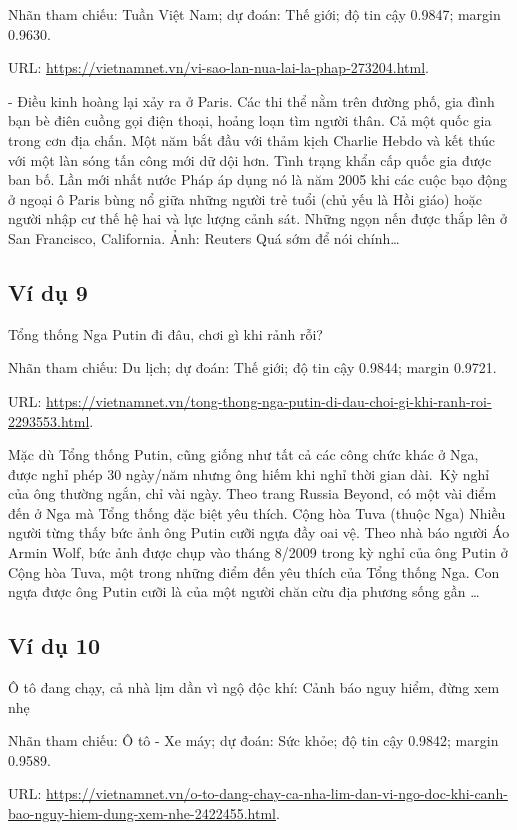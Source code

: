 \noindent Nhãn tham chiếu: Tuần Việt Nam; dự đoán: Thế giới; độ tin cậy 0.9847; margin 0.9630.

\noindent URL: \url{https://vietnamnet.vn/vi-sao-lan-nua-lai-la-phap-273204.html}.

- Điều kinh hoàng lại xảy ra ở Paris. Các thi thể nằm trên đường phố, gia đình bạn bè điên cuồng gọi điện thoại, hoảng loạn tìm người thân. Cả một quốc gia trong cơn địa chấn. Một năm bắt đầu với thảm kịch Charlie Hebdo và kết thúc với một làn sóng tấn công mới dữ dội hơn. Tình trạng khẩn cấp quốc gia được ban bố. Lần mới nhất nước Pháp áp dụng nó là năm 2005 khi các cuộc bạo động ở ngoại ô Paris bùng nổ giữa những người trẻ tuổi (chủ yếu là Hồi giáo) hoặc người nhập cư thế hệ hai và lực lượng cảnh sát. Những ngọn nến được thắp lên ở San Francisco, California. Ảnh: Reuters Quá sớm để nói chính\ldots

\subsection{Ví dụ 9}
Tổng thống Nga Putin đi đâu, chơi gì khi rảnh rỗi?

\noindent Nhãn tham chiếu: Du lịch; dự đoán: Thế giới; độ tin cậy 0.9844; margin 0.9721.

\noindent URL: \url{https://vietnamnet.vn/tong-thong-nga-putin-di-dau-choi-gi-khi-ranh-roi-2293553.html}.

Mặc dù Tổng thống Putin, cũng giống như tất cả các công chức khác ở Nga, được nghỉ phép 30 ngày/năm nhưng ông hiếm khi nghỉ thời gian dài. Kỳ nghỉ của ông thường ngắn, chỉ vài ngày. Theo trang Russia Beyond, có một vài điểm đến ở Nga mà Tổng thống đặc biệt yêu thích. Cộng hòa Tuva (thuộc Nga) Nhiều người từng thấy bức ảnh ông Putin cưỡi ngựa đầy oai vệ. Theo nhà báo người Áo Armin Wolf, bức ảnh được chụp vào tháng 8/2009 trong kỳ nghỉ của ông Putin ở Cộng hòa Tuva, một trong những điểm đến yêu thích của Tổng thống Nga. Con ngựa được ông Putin cưỡi là của một người chăn cừu địa phương sống gần \ldots

\subsection{Ví dụ 10}
Ô tô đang chạy, cả nhà lịm dần vì ngộ độc khí: Cảnh báo nguy hiểm, đừng xem nhẹ

\noindent Nhãn tham chiếu: Ô tô - Xe máy; dự đoán: Sức khỏe; độ tin cậy 0.9842; margin 0.9589.

\noindent URL: \url{https://vietnamnet.vn/o-to-dang-chay-ca-nha-lim-dan-vi-ngo-doc-khi-canh-bao-nguy-hiem-dung-xem-nhe-2422455.html}.


